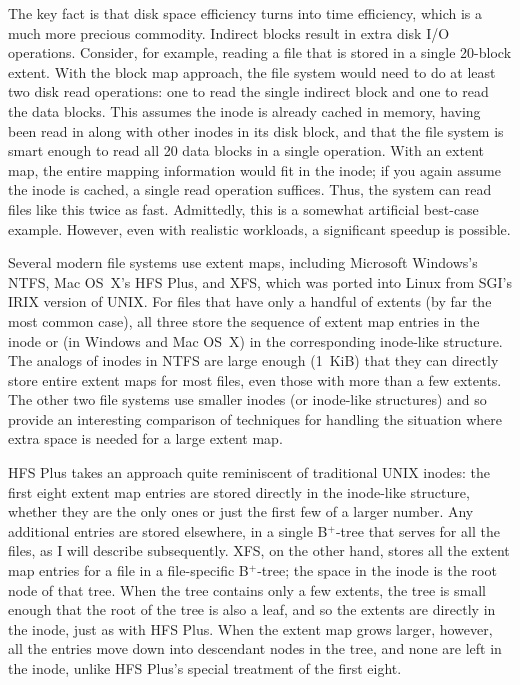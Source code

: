 The key fact is that disk space efficiency turns into time efficiency,
which is a much more precious commodity.  Indirect blocks result in
extra disk I/O operations.  Consider, for example, reading a file that
is stored in a single 20-block extent.  With the block map
approach, the file system would need to do at least two disk read
operations: one to read the single indirect block and one to read the
data blocks.  This assumes the inode is already cached in memory,
having been read in along with other inodes in its disk block, and
that the file system is smart enough to read all 20 data blocks in
a single operation.  With an extent map, the entire mapping
information would fit in the inode; if you again assume the inode is
cached, a single read operation suffices.  Thus, the system can read
files like this twice as fast.  Admittedly, this is a somewhat
artificial best-case example.  However, even with realistic workloads,
a significant speedup is possible.

Several modern file systems use extent maps, including Microsoft
Windows's NTFS, Mac OS~X's HFS Plus, and XFS, which was ported into
Linux from SGI's IRIX version of UNIX.  For files that have only a
handful of extents (by far the most common case), all three store the
sequence of extent map entries in the inode or (in Windows and Mac
OS~X) in the corresponding inode-like structure.  The analogs of inodes in
NTFS are large enough (1~KiB) that they can directly store entire
extent maps for most files, even those with more than a few extents. The other
two file systems use smaller inodes (or inode-like structures) and so
provide an interesting comparison of techniques for handling the
situation where extra space is needed for a large extent map.

HFS Plus takes an approach quite reminiscent of traditional UNIX
inodes: the first eight extent map entries are stored directly in the
inode-like structure, whether they are the only ones or just the first
few of a larger number.  Any additional entries are stored elsewhere,
in a single B${}^+$-tree that serves for all the files, as I will describe
subsequently.  XFS, on the other hand, stores all the extent map entries for
a file in a file-specific B${}^+$-tree; the space in the inode is the root
node of that tree.  When the tree contains only a few extents, the
tree is small enough that the
root of the tree is also a leaf, and so the extents are directly in
the inode, just as with HFS Plus.  When the extent map grows larger,
however, all the entries move down into descendant nodes in the tree,
and none are left in the inode, unlike HFS Plus's special treatment of
the first eight.

